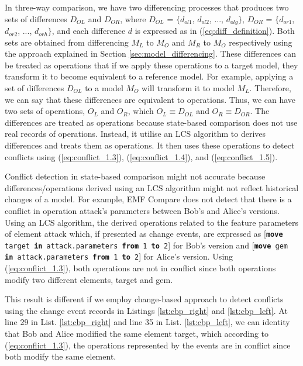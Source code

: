 In three-way comparison, we have two differencing processes that produces two sets of differences $D_{OL}$ and $D_{OR}$, where $D_{OL}$ = $\{d_{ol1}$, $d_{ol2}$, ..., $d_{olg}\}$, $D_{OR}$ = $\{d_{or1}$, $d_{or2}$, ..., $d_{orh}\}$, and each difference $d$ is expressed as in (\ref{eq:diff_definition}). Both sets are obtained from differencing $M_{L}$ to $M_{O}$ and $M_{R}$ to $M_{O}$ respectively using the approach explained in Section \ref{sec:model_differencing}. These differences can be treated as operations that if we apply these operations to a target model, they transform it to become equivalent to a reference model. For example, applying a set of differences $D_{OL}$ to a model $M_{O}$ will transform it to model $M_{L}$. Therefore, we can say that these differences are equivalent to operations. Thus, we can have two sets of operations, $O_{L}$ and $O_{R}$, which $O_{L} \equiv D_{OL}$ and $O_{R} \equiv D_{OR}$. The differences are treated as operations because state-based comparison does not use real records of operations. Instead, it utilise an LCS algorithm to derives differences and treats them as operations. It then uses these operations to detect conflicts using (\ref{eq:conflict_1.3}), (\ref{eq:conflict_1.4}), and (\ref{eq:conflict_1.5}).  

Conflict detection in state-based comparison might not accurate because differences/operations derived using an LCS algorithm might not reflect historical changes of a model.
For example, EMF Compare does not detect that there is a conflict in operation \textsf{attack}'s parameters between Bob's and Alice's versions.  Using an LCS algorithm, the derived operations related to the feature \textsf{parameters} of element \textsf{attack} which, if presented as change events, are expressed as [\texttt{\small \textbf{move} target \textbf{in} attack.parameters \textbf{from} 1 \textbf{to} 2}] for Bob's version and [\texttt{\small \textbf{move} gem \textbf{in} attack.parameters \textbf{from} 1 \textbf{to} 2}] for Alice's version. Using (\ref{eq:conflict_1.3}), both operations are not in conflict since both operations modify two different elements, target and gem. 

This result is different if we employ change-based approach to detect conflicts using the change event records in Listings \ref{lst:cbp_right} and \ref{lst:cbp_left}. At line 29 in List. \ref{lst:cbp_right} and line 35 in List. \ref{lst:cbp_left}, we can identity that Bob and Alice modified the same element \textsf{target}, which according to (\ref{eq:conflict_1.3}), the operations represented by the events are in conflict since both modify the same element.



